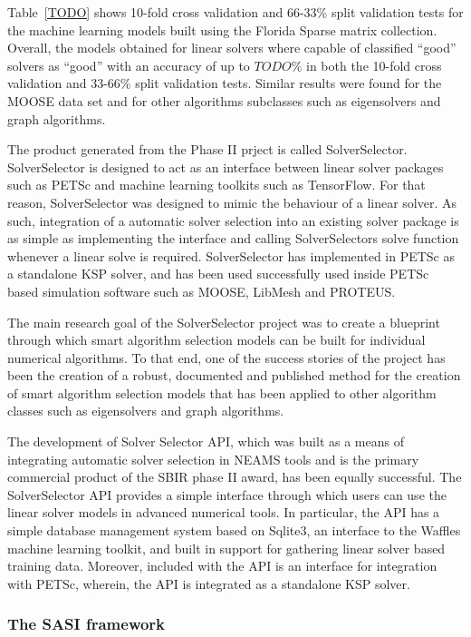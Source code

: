 Table~\ref{TODO} shows 10-fold cross validation and 66-33\% split validation tests for the machine learning models built using the Florida Sparse matrix collection. Overall, the models obtained for linear solvers where capable of classified ``good'' solvers as ``good'' with an accuracy of up to $TODO\%$ in both the 10-fold cross validation and 33-66\% split validation tests. Similar results were found for the MOOSE data set and for other algorithms subclasses such as eigensolvers and graph algorithms. 

The product generated from the Phase II prject is called SolverSelector. SolverSelector is designed to act as an interface between linear solver packages such as PETSc and machine learning toolkits such as TensorFlow. For that reason, SolverSelector was designed to mimic the behaviour of a linear solver. As such, integration of a automatic solver selection into an existing solver package is as simple as implementing the interface and calling SolverSelectors solve function whenever a linear solve is required. SolverSelector has implemented in PETSc as a standalone KSP solver, and has been used successfully used inside PETSc based simulation software such as MOOSE, LibMesh and PROTEUS.

The main research goal of the SolverSelector project was to create a blueprint through which smart algorithm selection models can be built for individual numerical algorithms. To that end, one of the success stories of the project has been the creation of a robust, documented and published method for the creation of smart algorithm selection models that has been applied to other algorithm classes such as eigensolvers and graph algorithms.   

The development of Solver Selector API, which was built as a means of integrating automatic solver selection in NEAMS tools and is the primary commercial product of the SBIR phase II award, has been equally successful. The SolverSelector API provides a simple interface through which users can use the linear solver models in advanced numerical tools. In particular, the API has a simple database management system based on Sqlite3, an interface to the Waffles machine learning toolkit, and built in support for gathering linear solver based training data. Moreover, included with the API is an interface for integration with PETSc, wherein, the API is integrated as a standalone KSP solver. 

\subsubsection{The SASI framework} 

